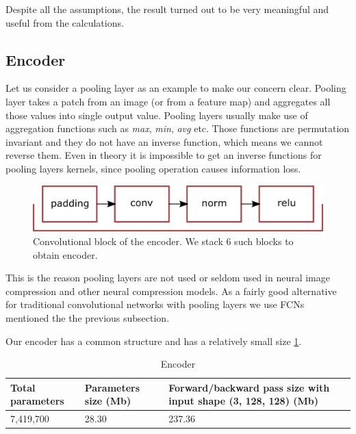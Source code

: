 Despite all the assumptions, the result turned out to be very meaningful and useful from the calculations.

\subsection{Encoder}

Let us consider a pooling layer as an example to make our concern clear. Pooling layer takes a patch from an image (or from a feature map) and aggregates all those values into single output value. Pooling layers usually make use of aggregation functions such as \textit{max}, \textit{min}, \textit{avg} etc. Those functions are permutation invariant and they do not have an inverse function, which means we cannot reverse them. Even in theory it is impossible to get an inverse functions for pooling layers kernels, since pooling operation causes information loss.

\begin{figure}[!ht]
    \centering
    \includegraphics[width=\textwidth]{figure/encoder.png}
    \caption{Convolutional block of the encoder. We stack 6 such blocks to obtain encoder.}
    \label{encoder}
\end{figure}

This is the reason pooling layers are not used or seldom used in neural image compression and other neural compression models. As a fairly good alternative for traditional convolutional networks with pooling layers we use FCNs mentioned the the previous subsection.

Our encoder has a common structure and has a relatively small size \ref{tab:encoder}.


\begin{table}
    \centering
    \caption{Encoder}
    \label{tab:encoder}
    \begin{tabular}{p{4cm}|p{4cm}|p{4cm}}
        \hline
        Total parameters & Parameters size (Mb) & Forward/backward pass size with input shape (3, 128, 128) (Mb) \\
        \hline
        7,419,700        & 28.30                & 237.36
    \end{tabular}
\end{table}

